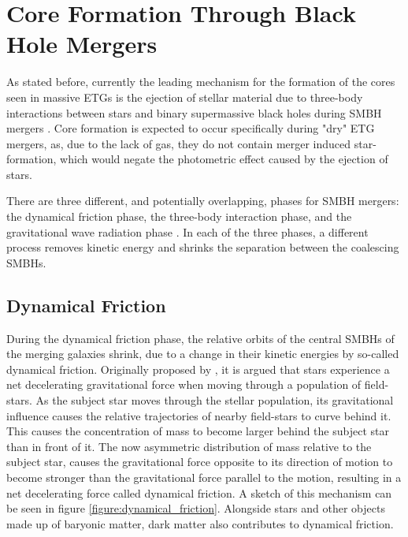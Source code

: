 \documentclass[english, oneside]{HYgradu}
\begin{document}
\section{Core Formation Through Black Hole Mergers}

As stated before, currently the leading mechanism for the formation of the cores seen in massive ETGs is the ejection of stellar material due to three-body interactions between stars and binary supermassive black holes during SMBH mergers \citep[e.g.][]{Faber1997, Milosavljevic2002, GalaxyFormationAndEvo2010}. Core formation is expected to occur specifically during "dry" ETG mergers, as, due to the lack of gas, they do not contain merger induced star-formation, which would negate the photometric effect caused by the ejection of stars.

There are three different, and potentially overlapping, phases for SMBH mergers: the dynamical friction phase, the three-body interaction phase, and the gravitational wave radiation phase \citep{MerrittBook}. In each of the three phases, a different process removes kinetic energy and shrinks the separation between the coalescing SMBHs.

\subsection{Dynamical Friction}

During the dynamical friction phase, the relative orbits of the central SMBHs of the merging galaxies shrink, due to a change in their kinetic energies by so-called dynamical friction. Originally proposed by \cite{Chandrasekhar1943}, it is argued that stars experience a net decelerating gravitational force when moving through a population of field-stars. As the subject star moves through the stellar population, its gravitational influence causes the relative trajectories of nearby field-stars to curve behind it. This causes the concentration of mass to become larger behind the subject star than in front of it. The now asymmetric distribution of mass relative to the subject star, causes the gravitational force opposite to its direction of motion to become stronger than the gravitational force parallel to the motion, resulting in a net decelerating force called dynamical friction. A sketch of this mechanism can be seen in figure \ref{figure:dynamical_friction}. Alongside stars and other objects made up of baryonic matter, dark matter also contributes to dynamical friction.
\end{document}
